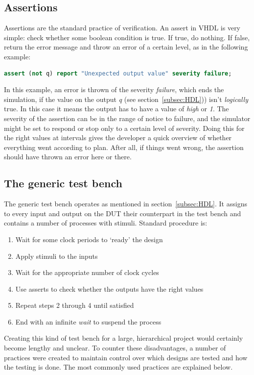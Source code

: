 \documentclass[11pt,british]{article}
\begin{document}
\subsection{Assertions}
\label{subsec:assertions}
Assertions are the standard practice of verification. An assert in VHDL is very simple: check whether some boolean condition is true.\cite{assertformal} If true, do nothing. If false, return the error message and throw an error of a certain level, as in the following example:
\begin{lstlisting}[language=VHDL, tabsize=4, frame=single, framesep=3mm, belowskip=8pt, aboveskip=8pt, showstringspaces=false, basicstyle=\small, linewidth=\textwidth]
assert (not q) report "Unexpected output value" severity failure;
\end{lstlisting}
In this example, an error is thrown of the severity \emph{failure}, which ends the simulation, if the value on the output \emph{q} (see section~\ref{subsec:HDL})) isn't \emph{logically} true. In this case it means the output has to have a value of \emph{high} or \emph{1}. The severity of the assertion can be in the range of notice to failure, and the simulator might be set to respond or stop only to a certain level of severity. Doing this for the right values at intervals gives the developer a quick overview of whether everything went according to plan. After all, if things went wrong, the assertion should have thrown an error here or there.

\subsection{The generic test bench}
The generic test bench operates as mentioned in section~\ref{subsec:HDL}. It assigns to every input and output on the \gls{DUT} their counterpart in the test bench and contains a number of processes with stimuli.\cite{generictestbench} Standard procedure is:
\begin{enumerate}%
\item Wait for some clock periods to `ready' the design
\item Apply stimuli to the inputs
\item Wait for the appropriate number of clock cycles
\item Use asserts to check whether the outputs have the right values
\item Repeat steps 2 through 4 until satisfied
\item End with an infinite \emph{wait} to suspend the process
\end{enumerate}
Creating this kind of test bench for a large, hierarchical project would certainly become lengthy and unclear. To counter these disadvantages, a number of practices were created to maintain control over which designs are tested and how the testing is done. The most commonly used practices are explained below.
\end{document}
